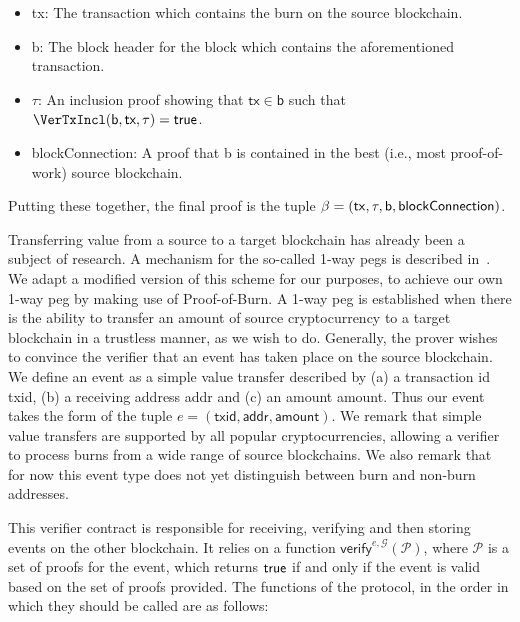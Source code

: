 \begin{itemize}
  \item \textsf{tx}: The transaction which contains the burn on the source blockchain.
  \item \textsf{b}: The block header for the block which contains the aforementioned transaction.
  \item $\tau$: An inclusion proof showing that $\mathsf{tx} \in \mathsf{b}$ such that $\VerTxIncl(\textsf{b}, \textsf{tx}, \tau) = \true$.
  \item \textsf{blockConnection}: A proof that \textsf{b} is contained in the best (i.e., most proof-of-work) source blockchain.
\end{itemize}

Putting these together, the final proof is the tuple $\beta = \sf(tx, \tau, b, blockConnection)$.

Transferring value from a source to a target blockchain has already been a subject of research. A mechanism for the so-called 1-way pegs is described in~\cite{pow-sidechains}. We adapt a modified version of this scheme for our purposes, to achieve our own 1-way peg by making use of Proof-of-Burn. A 1-way peg is established when there is the ability to transfer an amount of source cryptocurrency to a target blockchain in a trustless manner, as we wish to do. Generally, the prover wishes to convince the verifier that an event has taken place on the source blockchain. We define an event as a simple value transfer described by (a) a transaction id \textsf{txid}, (b) a receiving address \textsf{addr} and (c) an amount \textsf{amount}. Thus our event takes the form of the tuple $e = (\textsf{txid}, \textsf{addr}, \textsf{amount})$. We remark that simple value transfers are supported by all popular cryptocurrencies, allowing a verifier to process burns from a wide range of source blockchains. We also remark that for now this event type does not yet distinguish between burn and non-burn addresses.

This verifier contract is responsible for receiving, verifying and then storing events on the other blockchain. It relies on a function $\mathsf{verify}^{e,\mathcal{G}}(\mathcal{P})$, where $\mathcal{P}$ is a set of proofs for the event, which returns $\mathsf{true}$ if and only if the event is valid based on the set of proofs provided. The functions of the protocol, in the order in which they should be called are as follows:

